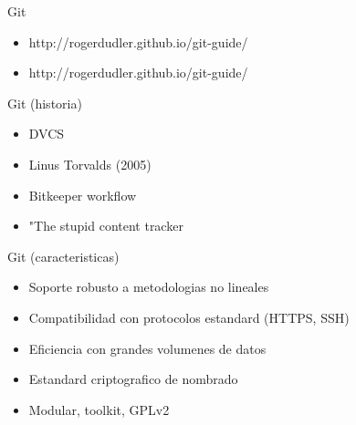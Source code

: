 \documentclass{beamer}
\begin{document}
\begin{frame}{Git}
	\begin{itemize}
		\item http://rogerdudler.github.io/git-guide/
		\item http://rogerdudler.github.io/git-guide/
	\end{itemize}
\end{frame}

\begin{frame}{Git (historia)}
	\begin{itemize}
		\item DVCS
		\item Linus Torvalds (2005)
		\item Bitkeeper workflow
		\item "The stupid content tracker
	\end{itemize}
\end{frame}

\begin{frame}{Git (caracteristicas)}
	\begin{itemize}
		\item Soporte robusto a metodologias no lineales
		\item Compatibilidad con protocolos estandard (HTTPS, SSH)
		\item Eficiencia con grandes volumenes de datos
		\item Estandard criptografico de nombrado
		\item Modular, toolkit, GPLv2
	\end{itemize}
\end{frame}
\end{document}
